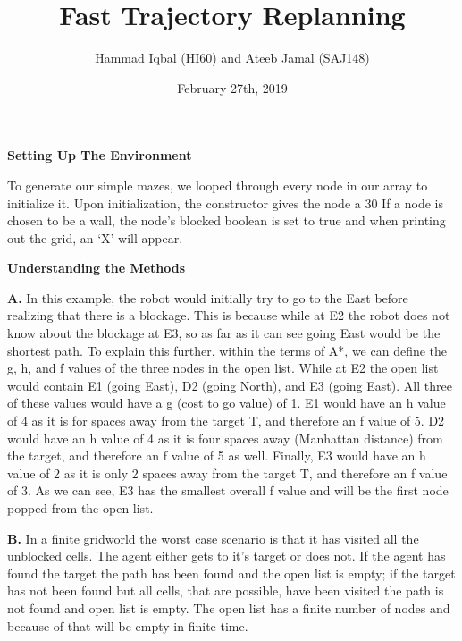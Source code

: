 \documentclass[12pt, letterpaper, twoside]{article}
\title{Fast Trajectory Replanning}
\author{Hammad Iqbal (HI60) and Ateeb Jamal (SAJ148)}
\date{February 27th, 2019}
\begin{document}
 
\begin{titlepage}
\maketitle
\end{titlepage}
\begin{center}
    \textbf{Setting Up The Environment}
\end{center}
\begin{flushleft}
    To generate our simple mazes, we looped through every node in our array to initialize it. 
    Upon initialization, the constructor gives the node a 30%
    If a node is chosen to be a wall, the node’s blocked boolean is set to true and when printing 
    out the grid, an ‘X’ will appear.
\end{flushleft}
\begin{center}
    \textbf{Understanding the Methods}
\end{center}
\begin{flushleft}
    \textbf{A.} In this example, the robot would initially try to go 
    to the East before realizing that there is a blockage. This is because 
    while at E2 the robot does not know about the blockage at E3, so as 
    far as it can see going East would be the shortest path. To explain this 
    further, within the terms of A*, we can define the g, h, and f values of the 
    three nodes in the open list. While at E2 the open list would contain E1 
    (going East), D2 (going North), and E3 (going East). All three of these values 
    would have a g (cost to go value) of 1. E1 would have an h value of 4 as it is 
    for spaces away from the target T, and therefore an f value of 5. D2 would have 
    an h value of 4 as it is four spaces away (Manhattan distance) from the target, 
    and therefore an f value of 5 as well. Finally, E3 would have an h value of 2 as 
    it is only 2 spaces away from the target T, and therefore an f value of 3. As we can see, E3 
    has the smallest overall f value and will be the first node popped from the open list.
\end{flushleft}
\begin{flushleft}
    \textbf{B.} In a finite gridworld the worst case scenario is that it has visited all the unblocked cells. The agent either gets to it’s target or does not. If the agent has found the target the path has been found and the open list is empty; if the target has not been found but all cells, that are possible, have been visited the path is not found and open list is empty. The open list has a finite number of nodes and because of that will be empty in finite time.     
\end{flushleft}
\end{document}

